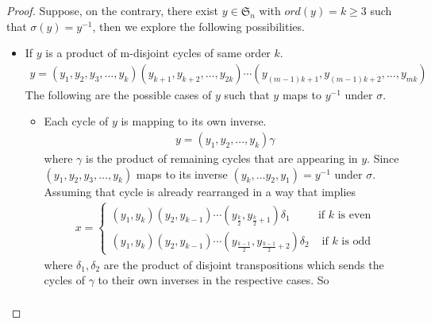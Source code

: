 \documentclass[oneside]{amsart}
\theoremstyle{plain}
\theoremstyle{definition}
\theoremstyle{remark}
\newcommand{\ord}{ord}
\begin{document}
        \begin{proof}
            Suppose, on the contrary, there exist $y \in \mathfrak{S}_n$ with $\ord (y) = k \geq 3$ such that $\sigma(y) = y^{-1}$, then we explore the following possibilities.
            \begin{itemize}
                \item[Case A.] If $y$ is a product of m-disjoint cycles of same order $k$.
                \begin{align*}
                    y = (y_1, y_2, y_3, \ldots , y_k)(y_{k + 1}, y_{k + 2}, \ldots, y_{2k})\cdots(y_{(m - 1)k + 1}, y_{(m - 1)k + 2}, \ldots ,y_{mk})
                \end{align*}
                The following are the possible cases of $y$ such that $y$ maps to $y^{-1}$ under $\sigma$. 
                \begin{itemize}
                    \item[Case (1)] Each cycle of $y$ is mapping to its own inverse.
                    \begin{align*}
                        y = (y_1, y_2, \ldots, y_k)\gamma
                    \end{align*}
                    where $\gamma$ is the product of remaining cycles that are appearing in $y$. Since $(y_1, y_2, y_3, \ldots , y_k)$ maps to its inverse $(y_k, \ldots y_2, y_1) = y^{-1}$ under $\sigma$. Assuming that cycle is already rearranged in a way that implies
                    \begin{align*}
                        x = \begin{cases}
                            (y_1, y_k)(y_2, y_{k - 1})\cdots(y_{\frac{k}{2}}, y_{\frac{k}{2} + 1})\delta_1 & \text{if } k \text{ is even}\\
                            (y_1, y_k)(y_2, y_{k - 1})\cdots(y_{\frac{k - 1}{2}}, y_{\frac{k - 1}{2} + 2})\delta_2 & \text{ if } k \text{ is odd}
                        \end{cases}
                    \end{align*}
                    where $\delta_1, \delta_2$ are the product of disjoint transpositions which sends the cycles of $\gamma$ to their own inverses in the respective cases. So
                    \begin{align*}

\end{align*}
\end{itemize}
\end{itemize}
\end{proof}
\end{document}
